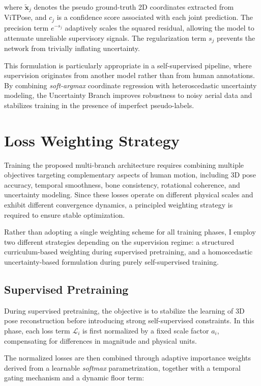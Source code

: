 where $\tilde{\mathbf{x}}_j$ denotes the pseudo ground-truth 2D coordinates extracted from ViTPose, and $c_j$ is a confidence score associated with each joint prediction. The precision term $e^{-s_j}$ adaptively scales the squared 
residual, allowing the model to attenuate unreliable supervisory signals. The regularization term $s_j$ prevents the network from trivially inflating uncertainty.

This formulation is particularly appropriate in a self-supervised pipeline, where supervision originates from another model rather than from human annotations. By combining \textit{soft-argmax} coordinate regression with 
heteroscedastic uncertainty modeling, the Uncertainty Branch improves robustness to noisy aerial data and stabilizes training in the presence of imperfect pseudo-labels.



\section{Loss Weighting Strategy}
\label{sec:loss_weighting}
Training the proposed multi-branch architecture requires combining multiple objectives targeting complementary aspects of human motion, including 3D pose accuracy, temporal smoothness, bone consistency, 
rotational coherence, and uncertainty modeling. 
Since these losses operate on different physical scales and exhibit different convergence dynamics, a principled weighting strategy is required to ensure stable optimization.

Rather than adopting a single weighting scheme for all training phases, I employ two different strategies depending on the supervision regime: a structured curriculum-based weighting during supervised 
pretraining, and a homoscedastic uncertainty-based formulation during purely self-supervised training.

\subsection{Supervised Pretraining}
During supervised pretraining, the objective is to stabilize the learning of 3D pose reconstruction before introducing strong self-supervised constraints. 
In this phase, each loss term $\mathcal{L}_i$ is first normalized by a fixed scale factor $a_i$, compensating for differences in magnitude and physical units.

The normalized losses are then combined through adaptive importance weights derived from a learnable \textit{softmax} parametrization, together with a temporal gating mechanism and a dynamic floor term:

